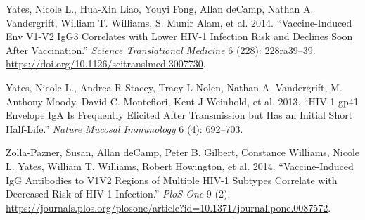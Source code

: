 \documentclass[12pt]{article}
\newenvironment{CSLReferences}%
  {}%
  {\par}
\begin{document}
\begin{CSLReferences}{1}{0}
\leavevmode{}%
Yates, Nicole L., Hua-Xin Liao, Youyi Fong, Allan deCamp, Nathan A.
Vandergrift, William T. Williams, S. Munir Alam, et al. 2014.
{``Vaccine-Induced {Env} {V}1-{V}2 {IgG}3 Correlates with Lower {HIV-1}
Infection Risk and Declines Soon After Vaccination.''} \emph{Science
Translational Medicine} 6 (228): 228ra39--39.
\url{https://doi.org/10.1126/scitranslmed.3007730}.

\leavevmode{}%
Yates, Nicole L., Andrea R Stacey, Tracy L Nolen, Nathan A. Vandergrift,
M. Anthony Moody, David C. Montefiori, Kent J Weinhold, et al. 2013.
{``{HIV}-1 {gp41} Envelope {IgA} Is Frequently Elicited After
Transmission but Has an Initial Short Half-Life.''} \emph{Nature Mucosal
Immunology} 6 (4): 692--703.

\leavevmode{}%
Zolla-Pazner, Susan, Allan deCamp, Peter B. Gilbert, Constance Williams,
Nicole L. Yates, William T. Williams, Robert Howington, et al. 2014.
{``Vaccine-Induced {IgG} Antibodies to {V1V2} Regions of Multiple
{HIV-1} Subtypes Correlate with Decreased Risk of {HIV-1} Infection.''}
\emph{PloS One} 9 (2).
\url{https://journals.plos.org/plosone/article?id=10.1371/journal.pone.0087572}.

\end{CSLReferences}
\end{document}
